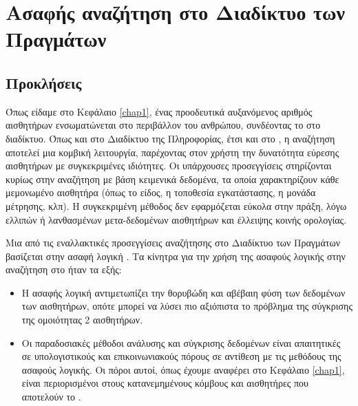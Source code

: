 \chapter{Ασαφής αναζήτηση στο Διαδίκτυο των Πραγμάτων}
\label{chap4}
\section{Προκλήσεις}
Όπως είδαμε στο Κεφάλαιο \ref{chap1}, ένας προοδευτικά αυξανόμενος αριθμός αισθητήρων ενσωματώνεται στο περιβάλλον του ανθρώπου, συνδέοντας το στο διαδίκτυο.
Όπως και στο Διαδίκτυο της Πληροφορίας, έτσι και στο , η αναζήτηση αποτελεί μια κομβική λειτουργία, παρέχοντας στον χρήστη την δυνατότητα εύρεσης αισθητήρων με συγκεκριμένες ιδιότητες.
Οι υπάρχουσες προσεγγίσεις \cite{Nath2007} στηρίζονται κυρίως στην αναζήτηση με βάση κειμενικά δεδομένα, τα οποία χαρακτηρίζουν κάθε μεμονωμένο αισθητήρα (όπως το είδος, η τοποθεσία εγκατάστασης, η μονάδα μέτρησης, κλπ).
Η συγκεκριμένη μέθοδος δεν εφαρμόζεται εύκολα στην πράξη, λόγω ελλιπών ή λανθασμένων μετα-δεδομένων αισθητήρων και έλλειψης κοινής ορολογίας.
\par
Μια από τις εναλλακτικές προσεγγίσεις αναζήτησης στο Διαδίκτυο των Πραγμάτων βασίζεται στην ασαφή λογική \cite{Truong2012}. 
Τα κίνητρα για την χρήση της ασαφούς λογικής στην αναζήτηση στο  ήταν τα εξής:
\begin{itemize}
    \item Η ασαφής λογική αντιμετωπίζει την θορυβώδη και αβέβαιη φύση των δεδομένων των αισθητήρων, οπότε μπορεί να λύσει πιο αξιόπιστα το πρόβλημα της σύγκρισης της ομοιότητας 2 αισθητήρων.
    \item Οι παραδοσιακές μέθοδοι ανάλυσης και σύγκρισης δεδομένων είναι απαιτητικές σε υπολογιστικούς και επικοινωνιακούς πόρους σε αντίθεση με τις μεθόδους της ασαφούς λογικής. Οι πόροι αυτοί, όπως έχουμε αναφέρει στο Κεφάλαιο \ref{chap1}, είναι περιορισμένοι στους κατανεμημένους κόμβους και αισθητήρες που αποτελούν το .
\end{itemize}
